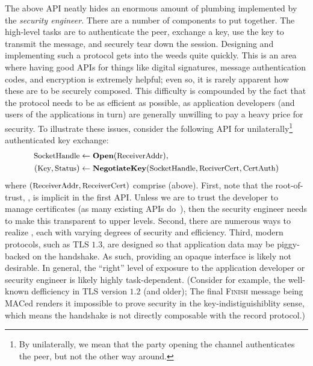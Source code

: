 The above API neatly hides an enormous amount of plumbing implemented by the
\emph{security engineer}. There are a number of components to put together. The
high-level tasks are to authenticate the peer, exchange a key, use the key to
transmit the message, and securely tear down the session. Designing and
implementing such a protocol gets into the weeds quite quickly. This is an area
where having good APIs for things like digital signatures, message
authentication codes, and encryption is extremely helpful; even so, it is rarely
apparent how these are to be securely composed. This difficulty is compounded by
the fact that the protocol needs to be as efficient as possible, as application
developers (and users of the applications in turn) are generally unwilling to
pay a heavy price for security.
%
To illustrate these issues, consider the following API for
unilaterally\footnote{By unilaterally, we mean that the party opening the
channel authenticates the peer, but not the other way around.}
authenticated key exchange:
\begin{align*}
  \textrm{\small SocketHandle} &\gets\textrm{\small\bf Open}(\textrm{\small ReceiverAddr}), \\
  (\textrm{\small Key}, \textrm{\small Status}) &\gets \textrm{\small\bf NegotiateKey}(
    \textrm{\small SocketHandle}, \textrm{\small ReciverCert}, \textrm{\small CertAuth})
\end{align*}
where $(\textrm{\small ReceiverAddr}, \textrm{\small ReceiverCert})$ comprise
 (above).  First, note that the root-of-trust,
, is implicit in the first API. Unless we are to trust the
developer to manage certificates (as many existing APIs do~\cite{xxx}), then the security engineer needs to
make this transparent to upper levels. Second, there are numerous ways to
realize , each with varying degrees of security and
efficiency. Third, modern protocols, such as TLS $1.3$, are designed so that
application data may be piggy-backed on the handshake. As such, providing an
opaque interface is likely not desirable. In general, the ``right'' level of
exposure to the application developer or security engineer is likely highly
task-dependent.
%
  (Consider for example, the well-known defficiency in TLS version $1.2$ (and
  older); The final \textsc{Finish} message being MACed renders it impossible to
  prove security in the key-indistiguishiblity sense, which means the handshake
  is not directly composable with the record protocol.)
\fi
%
\fi

